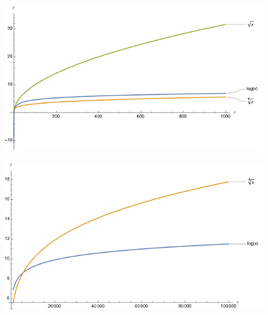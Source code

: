 \begin{figure}[H]
\includegraphics[width=6in]{img/log-growth}
\end{figure}

\begin{figure}[H]
\includegraphics[width=6in]{img/log-growth2}
\end{figure}


